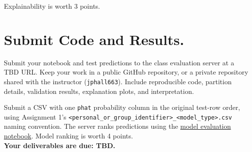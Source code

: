 \documentclass[fleqn]{article}
\begin{document}
\noindent Explainability is worth 3 points.

\section{Submit Code and Results.}

Submit your notebook and test predictions to the class evaluation server at a TBD URL. Keep your work in a public GitHub repository, or a private repository shared with the instructor (\texttt{jphall663}). Include reproducible code, partition details, validation results, explanation plots, and interpretation.

Submit a CSV with one \texttt{phat} probability column in the original test-row order, using Assignment 1's \texttt{<personal\_or\_group\_identifier>\_<model\_type>.csv} naming convention. The server ranks predictions using the \href{https://github.com/jphall663/GWU_rml/blob/master/assignment/eval.ipynb}{model evaluation notebook}. Model ranking is worth 4 points.\\

\noindent \textbf{Your deliverables are due: TBD.}
\end{document}
